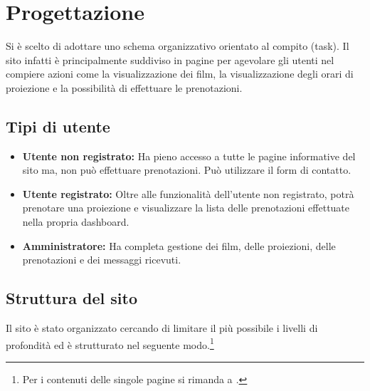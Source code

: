 \section{Progettazione}

Si è scelto di adottare uno schema organizzativo orientato al compito (task). Il sito infatti è principalmente suddiviso in pagine per agevolare gli utenti nel compiere azioni come la visualizzazione dei film, la visualizzazione degli orari di proiezione e la possibilità di effettuare le prenotazioni.

\subsection{Tipi di utente}

\begin{itemize}
    \item \textbf{Utente non registrato:} Ha pieno accesso a tutte le pagine informative del sito ma, non può effettuare prenotazioni. Può utilizzare il form di contatto.
    \item \textbf{Utente registrato:} Oltre alle funzionalità dell'utente non registrato, potrà prenotare una proiezione e visualizzare la lista delle prenotazioni effettuate nella propria dashboard.
    \item \textbf{Amministratore:} Ha completa gestione dei film, delle proiezioni, delle prenotazioni e dei messaggi ricevuti.
\end{itemize}

\subsection{Struttura del sito}

Il sito è stato organizzato cercando di limitare il più possibile i livelli di profondità ed è strutturato nel seguente modo.\footnote{Per i contenuti delle singole pagine si rimanda a \textit{.}}

